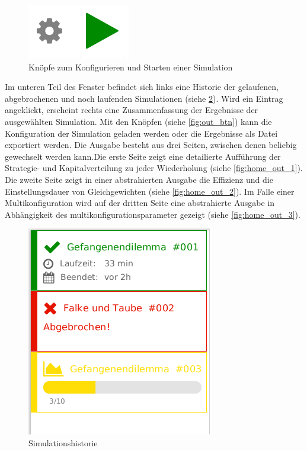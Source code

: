 \documentclass[parskip=full,11pt]{scrartcl}
\begin{document}
\begin{figure}[ht]
	\centering
 	\includegraphics[width=0.25\linewidth]{images/main_btn.png}
 	\caption{\label{fig:main_btn}
 		Knöpfe zum Konfigurieren und Starten einer Simulation}
\end{figure}


\newpage
Im unteren Teil des Fenster befindet sich links eine Historie der gelaufenen, abgebrochenen und noch laufenden Simulationen (siehe \cref{fig:history}). Wird ein Eintrag angeklickt, erscheint rechts eine Zusammenfassung der Ergebnisse der ausgewählten Simulation. Mit den Knöpfen (siehe \cref{fig:out_btn}) kann die \Gls{Konfiguration} der Simulation geladen werden oder die Ergebnisse als Datei exportiert werden. Die Ausgabe besteht aus drei Seiten, zwischen denen beliebig gewechselt werden kann.Die erste Seite zeigt eine detailierte Aufführung der Strategie- und Kapitalverteilung zu jeder Wiederholung (siehe \cref{fig:home_out_1}). Die zweite Seite zeigt in einer abstrahierten Ausgabe die \Gls{Effizienz} und die \Gls{Einstellungsdauer} von Gleichgewichten (siehe \cref{fig:home_out_2}). Im Falle einer Multikonfiguration wird auf der dritten Seite eine abstrahierte Ausgabe in Abhängigkeit des multikonfigurationsparameter gezeigt (siehe \cref{fig:home_out_3}).



\begin{figure}[hb]
	\centering
	\includegraphics[height=0.5\linewidth ]{images/history.png}
	\caption{\label{fig:history}
		Simulationshistorie }
\end{figure}
\end{document}
